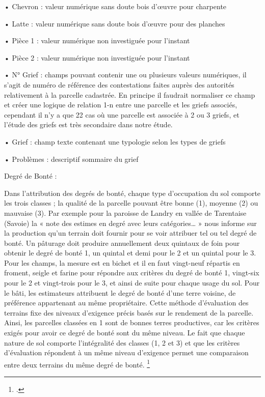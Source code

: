 \documentclass[12pt,a4paper]{report}
\begin{document}
•	Chevron : valeur numérique sans doute bois d'œuvre pour charpente

•	Latte : valeur numérique sans doute bois d'œuvre pour des planches

•	Pièce 1 : valeur numérique non investiguée pour l’instant

•	Pièce 2 : valeur numérique non investiguée pour l’instant

•	N° Grief : champs pouvant contenir une ou plusieurs valeurs numériques, il s’agit de numéro de référence des contestations faites auprès des autorités relativement à la parcelle cadastrée. En principe il faudrait normaliser ce champ et créer une logique de relation 1-n entre une parcelle et les griefs associés, cependant il n’y a que 22 cas où une parcelle est associée à 2 ou 3 griefs, et l’étude des griefs est très secondaire dans notre étude.

•	Grief : champ texte contenant une typologie selon les types de griefs

•	Problèmes : descriptif sommaire du grief


Degré de Bonté :

Dans l’attribution des degrés de bonté, chaque type d’occupation du sol comporte les trois classes ; la qualité de la parcelle pouvant être bonne (1), moyenne (2) ou mauvaise (3). Par exemple pour la paroisse de Landry en vallée de Tarentaise (Savoie) la « note des estimes en degré avec leurs catégories… » nous informe sur la production qu’un terrain doit fournir pour se voir attribuer tel ou tel degré de bonté. Un pâturage doit produire annuellement deux quintaux de foin pour obtenir le degré de bonté 1, un quintal et demi pour le 2 et un quintal pour le 3. Pour les champs, la mesure est en bichet et il en faut vingt-neuf répartis en froment, seigle et farine pour répondre aux critères du degré de bonté 1, vingt-six pour le 2 et vingt-trois pour le 3, et ainsi de suite pour chaque usage du sol. Pour le bâti, les estimateurs attribuent le degré de bonté d’une terre voisine, de préférence appartenant au même propriétaire. Cette méthode d’évaluation des terrains fixe des niveaux d’exigence précis basés sur le rendement de la parcelle. Ainsi, les parcelles classées en 1 sont de bonnes terres productives, car les critères exigés pour avoir ce degré de bonté sont du même niveau. Le fait que chaque nature de sol comporte l’intégralité des classes (1, 2 et 3) et que les critères d’évaluation répondent à un même niveau d’exigence permet une comparaison entre deux terrains du même degré de bonté. \footcite{Baud2010} 
\end{document}
